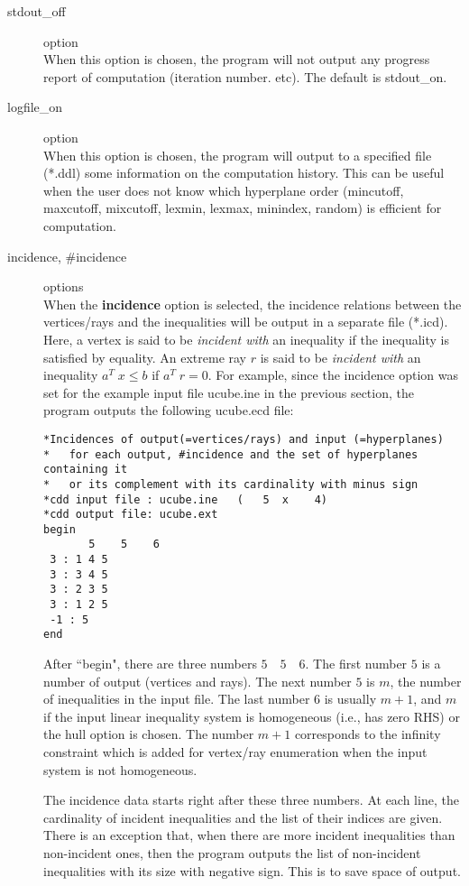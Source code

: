 \begin{description}
\item[stdout\_off] option\\
 When this option is chosen, the program will not
output any progress report of computation (iteration number. etc).
The default is stdout\_on.

\item[logfile\_on] option\\
 When this option is chosen, the program will output
to a specified file (*.ddl) some information on the computation history.
This can be useful when the user does not know which hyperplane order
(mincutoff, maxcutoff, mixcutoff, lexmin, lexmax, minindex, random)
is efficient for computation.

\item[incidence, \#incidence] options\\
When the {\bf incidence} option is selected, the incidence relations between
the vertices/rays and the inequalities will be output
in a separate file (*.icd).  Here, a vertex is said to be 
{\em incident with\/} an inequality if the inequality is satisfied by equality.
An extreme ray $r$ is said to be {\em incident with\/} 
an inequality $a^T \; x \le b$ if  $a^T \; r = 0$.  For example,
since the incidence option was set for the example input file ucube.ine in
the previous section, the program outputs the following ucube.ecd file:
\begin{verbatim}
*Incidences of output(=vertices/rays) and input (=hyperplanes)
*   for each output, #incidence and the set of hyperplanes containing it
*   or its complement with its cardinality with minus sign
*cdd input file : ucube.ine   (   5  x    4)
*cdd output file: ucube.ext
begin
       5    5    6
 3 : 1 4 5 
 3 : 3 4 5 
 3 : 2 3 5 
 3 : 1 2 5 
 -1 : 5 
end
\end{verbatim}
After ``begin", there are three numbers $5 \quad 5 \quad 6$.
The first number $5$ is a number of output (vertices and rays).
The next number $5$ is $m$, the number of inequalities in the input file.
The last number $6$ is usually $m+1$, and $m$ if the input linear inequality
system is homogeneous (i.e., has zero RHS) or the hull option is chosen.
The number $m+1$ corresponds to the infinity constraint which is added
for vertex/ray enumeration when the input system is not homogeneous.

The incidence data starts right after these three numbers.
At each line, the cardinality of incident inequalities and
the list of their indices are given.  There is an exception that, when
there are more incident inequalities than non-incident ones, then the program
outputs the list of non-incident inequalities with its
size with negative sign.  This is to save space of output.


\end{description}
